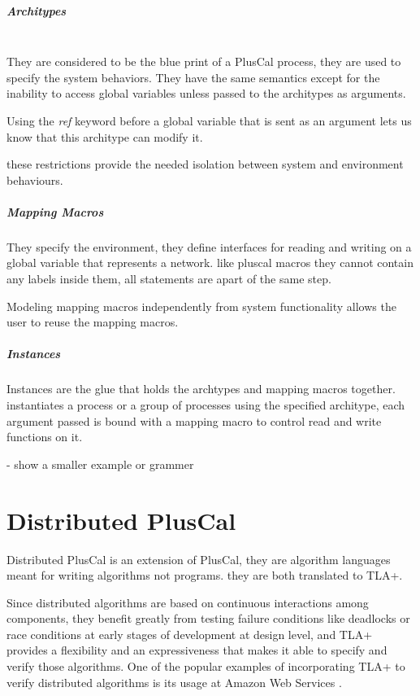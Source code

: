\documentclass{thesul}
\begin{document}
\paragraph{\textbf{Architypes}}
\hfill\\
They are considered to be the blue print of a PlusCal process, they are used to specify the system behaviors. They have the same semantics except for the inability to access global variables unless passed to the architypes as arguments.

Using the \textit{ref} keyword before a global variable that is sent as an argument lets us know that this architype can modify it.

these restrictions provide the needed isolation between system and environment behaviours.

\paragraph{Mapping Macros}

They specify the environment, they define interfaces for reading and writing on a global variable that represents a network.
like pluscal macros they cannot contain any labels inside them, all statements are apart of the same step.

Modeling mapping macros independently from system functionality allows the user to reuse the mapping macros.

\paragraph{Instances}

Instances are the glue that holds the archtypes and mapping macros together.
instantiates a process or a group of processes using the specified architype, each argument passed is bound with a mapping macro to control read and write functions on it.

- show a smaller example or grammer

\chapter{Distributed PlusCal}

Distributed PlusCal is an extension of PlusCal, they are algorithm languages meant for writing algorithms not programs. they are both translated to TLA+. 

Since distributed algorithms are based on continuous interactions among components, they benefit greatly from testing failure conditions like deadlocks or race conditions at early stages of development at design level, and TLA+ provides a flexibility and an expressiveness that makes it able to specify and verify those algorithms. One of the popular examples of incorporating TLA+ to verify distributed algorithms is its usage at Amazon Web Services \cite{amazon}.
\end{document}
